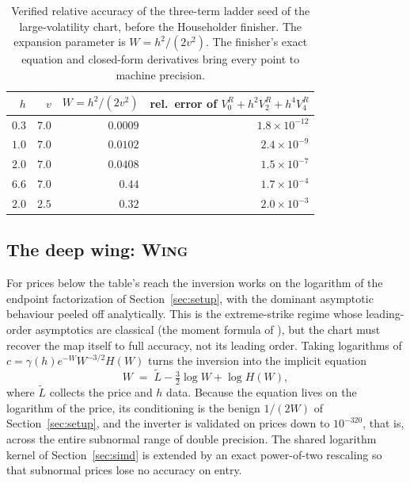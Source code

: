 \documentclass[11pt]{article}
\newcommand{\rtag}[1]{{\normalfont\scshape #1}}
\begin{document}
\begin{table}[t]
\centering
\small
\begin{tabular}{r r r r}
\toprule
$h$ & $v$ & $W=h^2/(2v^2)$ & rel.\ error of $V_0^{R}+h^2V_2^{R}+h^4V_4^{R}$ \\
\midrule
$0.3$ & $7.0$ & $0.0009$ & $1.8\times10^{-12}$ \\
$1.0$ & $7.0$ & $0.0102$ & $2.4\times10^{-9}$ \\
$2.0$ & $7.0$ & $0.0408$ & $1.5\times10^{-7}$ \\
$6.6$ & $7.0$ & $0.44$   & $1.7\times10^{-4}$ \\
$2.0$ & $2.5$ & $0.32$   & $2.0\times10^{-3}$ \\
\bottomrule
\end{tabular}
\caption{Verified relative accuracy of the three-term ladder seed of the large-volatility chart, before the Householder finisher. The expansion parameter is $W=h^2/(2v^2)$. The finisher's exact equation and closed-form derivatives bring every point to machine precision.}
\label{tab:ladder}
\end{table}

\subsection{The deep wing: \rtag{Wing}}
\label{sec:wing}

For prices below the table's reach the inversion works on the logarithm of the endpoint factorization of Section~\ref{sec:setup}, with the dominant asymptotic behaviour peeled off analytically. This is the extreme-strike regime whose leading-order asymptotics are classical (the moment formula of \citealt{lee2004moment}), but the chart must recover the map itself to full accuracy, not its leading order. Taking logarithms of $c=\gamma(h)e^{-W}W^{-3/2}H(W)$ turns the inversion into the implicit equation
\begin{equation}
  W \;=\; \widetilde L-\tfrac32\log W+\log H(W),
  \label{eq:wingeq}
\end{equation}
where $\widetilde L$ collects the price and $h$ data. Because the equation lives on the logarithm of the price, its conditioning is the benign $1/(2W)$ of Section~\ref{sec:setup}, and the inverter is validated on prices down to $10^{-320}$, that is, across the entire subnormal range of double precision. The shared logarithm kernel of Section~\ref{sec:simd} is extended by an exact power-of-two rescaling so that subnormal prices lose no accuracy on entry.
\end{document}
